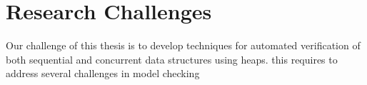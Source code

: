 \section*{Research Challenges}
%
Our challenge of this thesis is to develop techniques for automated verification of both sequential and concurrent data structures using heaps. this requires to address several challenges in model checking
